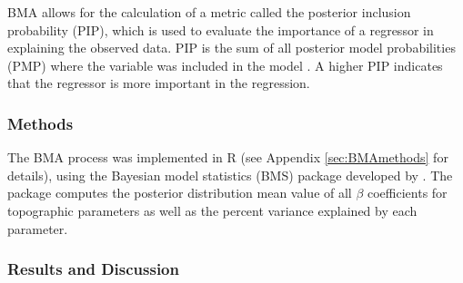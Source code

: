 \documentclass{sfuthesis}
\begin{document}
BMA allows for the calculation of a metric called the posterior inclusion probability (PIP), which is used to evaluate the importance of a regressor in explaining the observed data. PIP is the sum of all posterior model probabilities (PMP) where the variable was included in the model \citep{Zeugner2015}. A higher PIP indicates that the regressor is more important in the regression.  

\subsubsection{Methods}

The BMA process was implemented in R (see Appendix \ref{sec:BMAmethods} for details), using the Bayesian model statistics (BMS) package developed by \cite{Zeugner2015}. The package computes the posterior distribution mean value of all $\beta$ coefficients for topographic parameters as well as the percent variance explained by each parameter.

\subsubsection{Results and Discussion}
\end{document}
